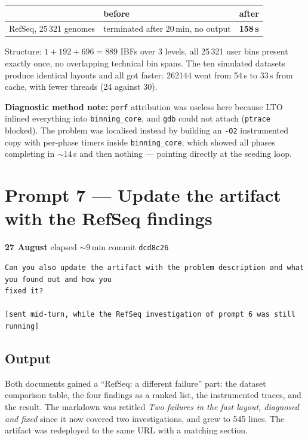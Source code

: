 \documentclass[11pt,a4paper]{article}
\newenvironment{promptbox}{\medskip}{\medskip}
\newcommand{\code}[1]{\lstinline[basicstyle=\ttfamily\small]!#1!}
\newcommand{\sha}[1]{\texttt{#1}}
\newcommand{\good}[1]{\textcolor{okgreen}{\textbf{#1}}}
\newcommand{\bad}[1]{\textcolor{warn}{#1}}
\begin{document}
\begin{longtable}{@{}p{7.2cm}p{4.0cm}p{3.4cm}@{}}
\toprule
 & \textbf{before} & \textbf{after} \\
\midrule
RefSeq, 25\,321 genomes & \bad{terminated after 20\,min, no output} & \good{158\,s} \\
\bottomrule
\end{longtable}

\noindent Structure: $1 + 192 + 696 = 889$ IBFs over 3 levels, all 25\,321 user bins present
exactly once, no overlapping technical bin spans. The ten simulated datasets produce identical
layouts and all got faster: 262144 went from 54\,s to 33\,s from cache, with fewer threads
(24 against 30).

\medskip\noindent\textbf{Diagnostic method note:} \texttt{perf} attribution was useless here
because LTO inlined everything into \code{binning_core}, and \texttt{gdb} could not attach
(\texttt{ptrace} blocked). The problem was localised instead by building an \texttt{-O2}
instrumented copy with per-phase timers inside \code{binning_core}, which showed all phases
completing in ${\sim}14$\,s and then nothing --- pointing directly at the seeding loop.

\section{Prompt 7 --- Update the artifact with the RefSeq findings}
\textbf{27 August} \textperiodcentered{} elapsed ${\sim}$9\,min \textperiodcentered{} commit \sha{dcd8c26}
\begin{promptbox}
\begin{lstlisting}[style=promptstyle]
Can you also update the artifact with the problem description and what you found out and how you
fixed it?

[sent mid-turn, while the RefSeq investigation of prompt 6 was still running]
\end{lstlisting}
\end{promptbox}
\subsection*{Output}

Both documents gained a ``RefSeq: a different failure'' part: the dataset comparison table, the four
findings as a ranked list, the instrumented traces, and the result. The markdown was retitled
\emph{Two failures in the fast layout, diagnosed and fixed} since it now covered two investigations,
and grew to 545 lines. The artifact was redeployed to the same URL with a matching section.
\end{document}
